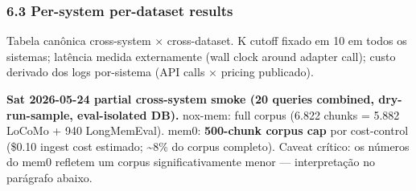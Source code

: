 \documentclass[
]{article}
\begin{document}
\subsubsection{6.3 Per-system per-dataset
results}\label{per-system-per-dataset-results}

Tabela canônica cross-system × cross-dataset. K cutoff fixado em 10 em
todos os sistemas; latência medida externamente (wall clock around
adapter call); custo derivado dos logs por-sistema (API calls × pricing
publicado).

\textbf{Sat 2026-05-24 partial cross-system smoke (20 queries combined,
dry-run-sample, eval-isolated DB).} nox-mem: full corpus (6.822 chunks =
5.882 LoCoMo + 940 LongMemEval). mem0: \textbf{500-chunk corpus cap} por
cost-control (\$0.10 ingest cost estimado; \textasciitilde8\% do corpus
completo). Caveat crítico: os números do mem0 refletem um corpus
significativamente menor --- interpretação no parágrafo abaixo.
\end{document}
